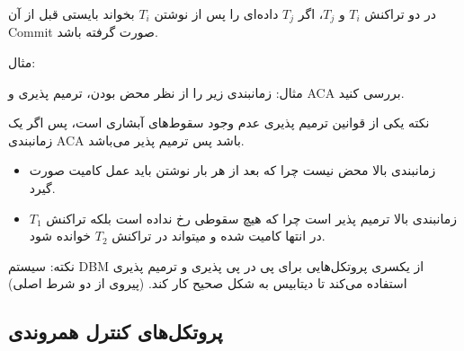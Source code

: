 \documentclass[a4paper]{article}
\begin{document}
در دو تراکنش $T_{i}$ و $T_{j}$، اگر $T_{j}$ داده‌ای را پس از نوشتن $T_{i}$
بخواند بایستی قبل از آن Commit صورت گرفته باشد.

مثال: 

\begin{LTR}
    \begin{table}[h]
        \centering
        \begin{RTL}
            \caption{نمونه‌ای از زمانبندی محض}
        \end{RTL}
    \end{table}
\end{LTR}

مثال: زمانبندی زیر را از نظر محض بودن، ترمیم پذیری و ACA بررسی کنید.

نکته یکی از قوانین ترمیم پذیری عدم وجود سقوط‌های آبشاری است، پس اگر یک زمانبندی
ACA باشد پس ترمیم پذیر می‌باشد.

\begin{LTR}
    \begin{table}[h]
        \centering
    \end{table}
\end{LTR}

\begin{itemize}
    \item زمانبندی بالا محض نیست چرا که بعد از هر بار نوشتن باید عمل کامیت صورت
    گیرد.
    \item زمانبندی بالا ترمیم پذیر است چرا که هیچ سقوطی رخ نداده است بلکه تراکنش
    $T_{1}$ در انتها کامیت شده و میتواند در تراکنش $T_{2}$ خوانده شود.
\end{itemize}

نکته: سیستم DBM از یکسری پروتکل‌هایی برای پی در پی پذیری و ترمیم پذیری استفاده
می‌کند تا دیتابیس به شکل صحیح کار کند. (پیروی از دو شرط اصلی)

\subsection{پروتکل‌های کنترل همروندی}
\end{document}
